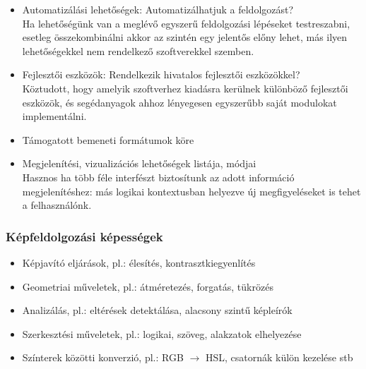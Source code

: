 \documentclass[a4paper,12pt,oneside]{report}
\begin{document}
\begin{itemize}
	\item Automatizálási lehetőségek: Automatizálhatjuk a feldolgozást?\\Ha lehetőségünk van a meglévő egyszerű feldolgozási lépéseket testreszabni, esetleg összekombinálni akkor az szintén egy jelentős előny lehet, más ilyen lehetőségekkel nem rendelkező szoftverekkel szemben.
	\item Fejlesztői eszközök: Rendelkezik hivatalos fejlesztői eszközökkel?\\Köztudott, hogy amelyik szoftverhez kiadásra kerülnek különböző fejlesztői eszközök, és segédanyagok ahhoz lényegesen egyszerűbb saját modulokat implementálni.
	\item Támogatott bemeneti formátumok köre
	\item Megjelenítési, vizualizációs lehetőségek listája, módjai\\Hasznos ha több féle interfészt biztosítunk az adott információ megjelenítéshez: más logikai kontextusban helyezve új megfigyeléseket is tehet a felhasználónk.

\end{itemize}


\subsubsection{Képfeldolgozási képességek}
\begin{itemize}
	\itemsep0em
	\item Képjavító eljárások, pl.: élesítés, kontrasztkiegyenlítés
	\item Geometriai műveletek, pl.: átméretezés, forgatás, tükrözés
	\item Analizálás, pl.: eltérések detektálása, alacsony szintű képleírók
	\item Szerkesztési műveletek, pl.: logikai, szöveg, alakzatok elhelyezése
	\item Színterek közötti konverzió, pl.: RGB $\rightarrow $ HSL, csatornák külön kezelése stb

\end{itemize}
\end{document}
